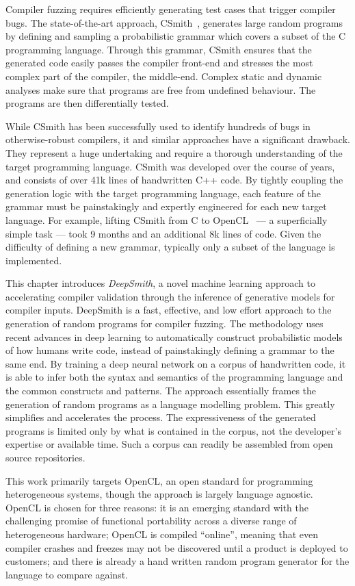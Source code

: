 Compiler fuzzing requires efficiently generating test cases that trigger compiler bugs. The state-of-the-art approach, CSmith~\cite{Yang2011}, generates large random programs by defining and sampling a probabilistic grammar which covers a subset of the C programming language. Through this grammar, CSmith ensures that the generated code easily passes the compiler front-end and stresses the most complex part of the compiler, the middle-end. Complex static and dynamic analyses make sure that programs are free from undefined behaviour. The programs are then differentially tested.

While CSmith has been successfully used to identify hundreds of bugs in otherwise-robust  compilers, it and similar approaches have a significant drawback. They represent a huge undertaking and require a thorough understanding of the target programming language. CSmith was developed over the course of years, and consists of over 41k lines of handwritten C++ code. By tightly coupling the generation logic with the target programming language, each feature of the grammar must be painstakingly and expertly engineered for each new target language. For example, lifting CSmith from C to OpenCL~\cite{Lidbury2015a} --- a superficially simple task --- took 9 months and an additional 8k lines of code. Given the difficulty of defining a new grammar, typically only a subset of the language is implemented.

This chapter introduces \emph{DeepSmith}, a novel machine learning approach to accelerating compiler validation through the inference of generative models for compiler inputs. DeepSmith is a fast, effective, and low effort approach to the generation of random programs for compiler fuzzing. The methodology uses recent advances in deep learning to automatically construct probabilistic models of how humans write code, instead of painstakingly defining a grammar to the same end. By training a deep neural network on a corpus of handwritten code, it is able to infer both the syntax and semantics of the programming language and the common constructs and patterns. The approach essentially frames the generation of random programs as a language modelling problem. This greatly simplifies and accelerates the process. The expressiveness of the generated programs is limited only by what is contained in the corpus, not the developer's expertise or available time. Such a corpus can readily be assembled from open source repositories.

This work primarily targets OpenCL, an open standard for programming heterogeneous systems, though the approach is largely language agnostic. OpenCL is chosen for three reasons: it is an emerging standard with the challenging promise of functional portability across a diverse range of heterogeneous hardware; OpenCL is compiled ``online'', meaning that even compiler crashes and freezes may not be discovered until a product is deployed to customers; and there is already a hand written random program generator for the language to compare against.

